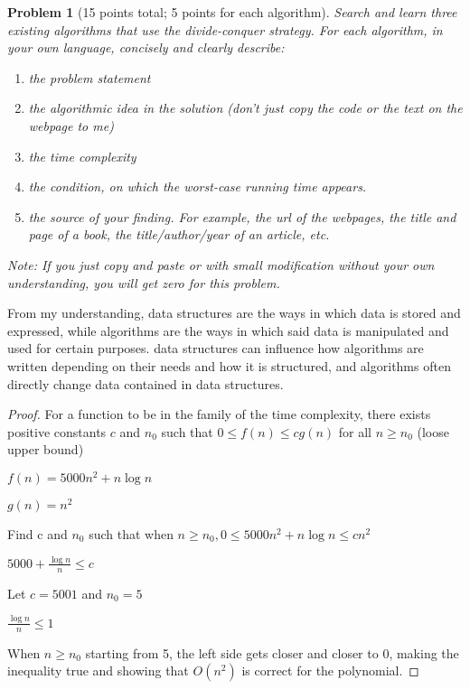 \documentclass[11pt]{article}
\newtheorem{problem}{Problem}
\begin{document}
\begin{problem}[15 points total; 5 points for each algorithm]
\label{prob:8}
Search and learn three existing algorithms that
use the divide-conquer strategy. For each algorithm, in your own language, concisely and clearly describe:

\begin{enumerate}
\item the problem statement

\item the algorithmic idea in the solution (don’t just copy the code or the text on the webpage to me)

\item the time complexity

\item the condition, on which the worst-case running time appears.

\item the source of your finding. For example, the url of the webpages, the title and page of a book, the
title/author/year of an article, etc.
\end{enumerate}

Note: If you just copy and paste or with small modification without your own understanding, you will
get zero for this problem.
\end{problem}


\newpage


\bigskip
{}

From my understanding, data structures are the ways in which data is stored and expressed, 
while algorithms are the ways in which said data is manipulated and used for certain purposes. 
data structures can influence how algorithms are written depending on their needs and how it is structured, 
and algorithms often directly change data contained in data structures.
\bigskip



\begin{proof} For a function to be in the family of the time complexity, there exists positive constants $c$ and $n_0$ such that $0\leq f(n)\leq cg(n)$ for all $n\geq n_0$ (loose upper bound)

$f(n)=5000n^2+n\log n$

$g(n)=n^2$

Find c and $n_0$ such that when $n\geq n_0, 0\leq 5000n^2+n\log n\leq cn^2$

$5000+\frac{\log n}{n}\leq c$

Let $c=5001$ and $n_0=5$

$\frac{\log n}{n}\leq 1$

When $n\geq n_0$ starting from 5, the left side gets closer and closer to 0, making the inequality true and showing that $O(n^2)$ is correct for the polynomial.
\end{proof}
\end{document}
